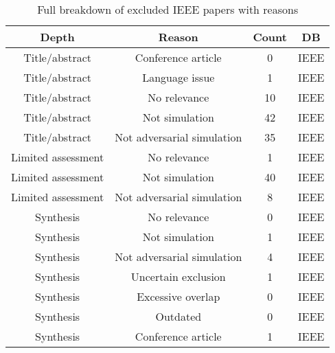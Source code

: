 \documentclass{article}
\begin{document}
\begin{center}
\begin{table}[h!]
\begin{tabular}{ | c | c | c | c | }
\hline
Depth & Reason & Count & DB \\
\hline
Title/abstract & Conference article & 0 & IEEE \\
\hline
Title/abstract & Language issue & 1 & IEEE \\
\hline
Title/abstract & No relevance & 10 & IEEE \\
\hline
Title/abstract & Not simulation & 42 & IEEE \\
\hline
Title/abstract & Not adversarial simulation & 35 & IEEE \\
\hline
Limited assessment & No relevance & 1 & IEEE \\
\hline
Limited assessment & Not simulation & 40 & IEEE \\
\hline
Limited assessment & Not adversarial simulation & 8 & IEEE \\
\hline
Synthesis & No relevance & 0 & IEEE \\
\hline
Synthesis & Not simulation & 1 & IEEE \\
\hline
Synthesis & Not adversarial simulation & 4 & IEEE \\
\hline
Synthesis & Uncertain exclusion & 1 & IEEE \\
\hline
Synthesis & Excessive overlap & 0 & IEEE \\
\hline
Synthesis & Outdated & 0 & IEEE \\
\hline
Synthesis & Conference article & 1 & IEEE \\
\hline
\end{tabular}
\caption{\label{table:RelevanceBreakdownIEEE} Full breakdown of excluded IEEE papers with reasons}
\end{table}
\end{center}
\end{document}
